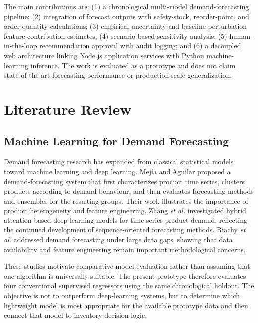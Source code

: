 \documentclass[9pt,conference]{IEEEtran}
\providecommand{\syscite}[1]{}
\begin{document}
The main contributions are: (1) a chronological multi-model demand-forecasting pipeline; (2) integration of forecast outputs with safety-stock, reorder-point, and order-quantity calculations; (3) empirical uncertainty and baseline-perturbation feature contribution estimates; (4) scenario-based sensitivity analysis; (5) human-in-the-loop recommendation approval with audit logging; and (6) a decoupled web architecture linking Node.js application services with Python machine-learning inference. \syscite{[cite: 1]} The work is evaluated as a prototype and does not claim state-of-the-art forecasting performance or production-scale generalization. \syscite{[cite: 1]}

\section{Literature Review}

\subsection{Machine Learning for Demand Forecasting}
Demand forecasting research has expanded from classical statistical models toward machine learning and deep learning. \syscite{[cite: 1]} Mejía and Aguilar proposed a demand-forecasting system that first characterizes product time series, clusters products according to demand behaviour, and then evaluates forecasting methods and ensembles for the resulting groups. \syscite{[cite: 1]} Their work illustrates the importance of product heterogeneity and feature engineering. \syscite{[cite: 1]} Zhang \textit{et al.} investigated hybrid attention-based deep-learning models for time-series product demand, reflecting the continued development of sequence-oriented forecasting methods. \syscite{[cite: 1]} Riachy \textit{et al.} addressed demand forecasting under large data gaps, showing that data availability and feature engineering remain important methodological concerns. \syscite{[cite: 1]}

These studies motivate comparative model evaluation rather than assuming that one algorithm is universally suitable. \syscite{[cite: 1]} The present prototype therefore evaluates four conventional supervised regressors using the same chronological holdout. \syscite{[cite: 1]} The objective is not to outperform deep-learning systems, but to determine which lightweight model is most appropriate for the available prototype data and then connect that model to inventory decision logic. \syscite{[cite: 1]}
\end{document}
